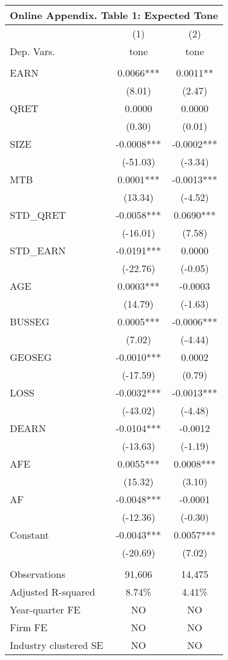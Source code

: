 \begin{table}[htbp] \label{oat1}
  \centering
    \begin{tabular}{lcc}
    \multicolumn{3}{c}{\textbf{Online Appendix. Table 1: Expected Tone}} \\
    \midrule
      & (1) & (2) \\
    Dep. Vars. & tone & tone \\
    \midrule
      &   &  \\
    EARN & 0.0066*** & 0.0011** \\
      & (8.01) & (2.47) \\
    QRET & 0.0000 & 0.0000 \\
      & (0.30) & (0.01) \\
    SIZE &-0.0008*** &-0.0002*** \\
      & (-51.03) & (-3.34) \\
    MTB &0.0001*** &-0.0013*** \\
      & (13.34) & (-4.52) \\
    STD\_QRET & -0.0058*** & 0.0690*** \\
      & (-16.01) & (7.58) \\
    STD\_EARN & -0.0191*** & 0.0000 \\
      & (-22.76) & (-0.05) \\
    AGE & 0.0003*** & -0.0003 \\
      & (14.79) & (-1.63) \\
    BUSSEG & 0.0005*** & -0.0006***\\
      & (7.02) & (-4.44) \\
    GEOSEG & -0.0010*** & 0.0002 \\
      & (-17.59) & (0.79) \\
    LOSS &-0.0032*** &-0.0013*** \\
      & (-43.02) & (-4.48) \\
    DEARN & -0.0104*** & -0.0012 \\
      & (-13.63) & (-1.19) \\
    AFE & 0.0055*** & 0.0008*** \\
      & (15.32) & (3.10) \\
    AF & -0.0048*** & -0.0001 \\
      & (-12.36) & (-0.30) \\
    Constant & -0.0043*** & 0.0057*** \\
      & (-20.69) & (7.02) \\
      &   &  \\
    Observations & 91,606 & 14,475 \\
    Adjusted R-squared & 8.74\% & 4.41\% \\
    Year-quarter FE & NO & NO \\
    Firm FE & NO & NO \\
    Industry clustered SE & NO & NO \\
    \bottomrule
    \end{tabular}%
\end{table}%
